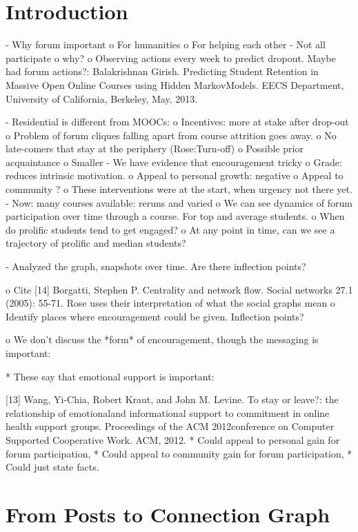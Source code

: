 
\section{Introduction}

- Why forum important
    o For humanities
    o For helping each other
- Not all participate
    o why?
    o Observing actions every week to predict dropout.
      Maybe had forum actions?:
      Balakrishnan Girish. Predicting Student Retention in Massive
      Open Online Courses using Hidden MarkovModels. EECS Department,
      University of California, Berkeley, May, 2013.   

- Residential is different from MOOCs:
    o Incentives: more at stake after drop-out
    o Problem of forum cliques falling apart from
      course attrition goes away.
    o No late-comers that stay at the periphery
        (Rose:Turn-off)
    o Possible prior acquaintance
    o Smaller
- We have evidence that encouragement tricky
    o Grade: reduces intrinsic motivation.
    o Appeal to personal growth: negative
    o Appeal to community ?
    o These interventions were at the start, when
        urgency not there yet.
- Now: many courses available: reruns and varied
    o We can see dynamics of forum participation
      over time through a course. For top and
      average students.
    o When do prolific students tend to get engaged?
    o At any point in time, can we see a
      trajectory of prolific and median students?

- Analyzed the graph, snapshots over time. Are there
  inflection points?

    o Cite
      [14] Borgatti, Stephen P. Centrality and network flow. Social
      networks 27.1 (2005): 55-71. Rose uses their interpretation of
      what the social graphs mean 
    o Identify places where encouragement could be given.
      Inflection points?

    o We don't discuss the *form* of encouragement, though
      the messaging is important:

      * These say that emotional support is important:

        [13] Wang, Yi-Chia, Robert Kraut, and John M. Levine. To stay
        or leave?: the relationship of emotionaland informational support
        to commitment in online health support groups. Proceedings of the
        ACM 2012conference on Computer Supported Cooperative Work. ACM,
        2012.       
      * Could appeal to personal gain for forum participation,
      * Could appeal to community gain for forum participation,
      * Could just state facts.

\section{From Posts to Connection Graph}




